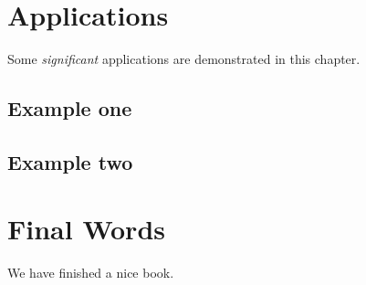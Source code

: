 \documentclass[
  b5paper,
]{scrbook}
\theoremstyle{definition}
\theoremstyle{definition}
\theoremstyle{definition}
\theoremstyle{remark}
\begin{document}
\hypertarget{applications}{%
\chapter{Applications}\label{applications}}

Some \emph{significant} applications are demonstrated in this chapter.

\hypertarget{example-one}{%
\section{Example one}\label{example-one}}

\hypertarget{example-two}{%
\section{Example two}\label{example-two}}

\hypertarget{final-words}{%
\chapter{Final Words}\label{final-words}}

We have finished a nice book.

\backmatter
  
\end{document}
